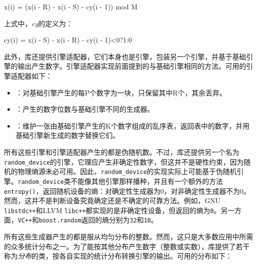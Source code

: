 
x(i) = (x(i - R) - x(i - S) - cy(i - 1)) mod M



上式中，\textit{cy}的定义为：



cy(i) = x(i - S) - x(i - R) - cy(i - 1)<0?1:0



此外，库还提供引擎适配器，它们本身也是引擎，包装另一个引擎，并基于基础引擎的输出产生数字。引擎适配器实现前面提到的与基础引擎相同的方法。可用的引擎适配器如下：



\begin{itemize}
\item {}：对基础引擎产生的每P个数字为一块，只保留其中R个，其余丢弃。



\item {}：产生的数字位数与基础引擎不同的生成器。



\item {}：维护一张由基础引擎产生的K个数字组成的乱序表，返回表中的数字，并用基础引擎新生成的数字替换它们。

\end{itemize}



所有这些引擎和引擎适配器产生的都是伪随机数。不过，库还提供另一个名为\texttt{random\_\allowbreak{}device}的引擎，它理应产生非确定性数字，但这并不是硬性约束，因为随机的物理熵源未必可用。因此，\texttt{random\_\allowbreak{}device}的实现实际上可能基于伪随机引擎。\texttt{random\_\allowbreak{}device}类不能像其他引擎那样播种，并且有一个额外的方法\texttt{entropy()}，返回随机设备的熵：对确定性生成器为0，对非确定性生成器不为0。然而，这并不是判断设备究竟确定还是不确定的可靠方法。例如，GNU \texttt{libstdc++}和LLVM \texttt{libc++}都实现的是非确定性设备，但返回的熵为\texttt{0}。另一方面，\texttt{VC++}和\texttt{boost.\allowbreak{}random}返回的熵分别为\texttt{32}和\texttt{10}。



所有这些生成器产生的都是服从均匀分布的整数。然而，这只是大多数应用中所需的众多统计分布之一。为了能按其他分布产生数字（整数或实数），库提供了若干称为\textit{分布}的类，按各自实现的统计分布转换引擎的输出。可用的分布如下：


